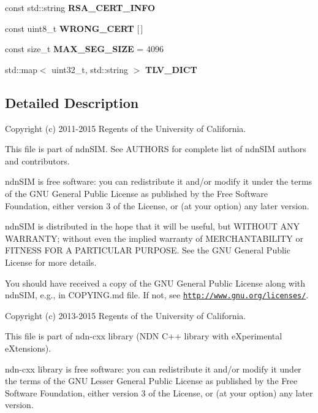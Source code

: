 \begin{DoxyCompactItemize}
\item 
const std\+::string {\bfseries R\+S\+A\+\_\+\+C\+E\+R\+T\+\_\+\+I\+N\+FO}
\item 
const uint8\+\_\+t {\bfseries W\+R\+O\+N\+G\+\_\+\+C\+E\+RT} \mbox{[}$\,$\mbox{]}
\item 
const size\+\_\+t {\bfseries M\+A\+X\+\_\+\+S\+E\+G\+\_\+\+S\+I\+ZE} = 4096\hypertarget{namespacendn_a19fec05a319244ed54c7f95a86642722}{}\label{namespacendn_a19fec05a319244ed54c7f95a86642722}

\item 
std\+::map$<$ uint32\+\_\+t, std\+::string $>$ {\bfseries T\+L\+V\+\_\+\+D\+I\+CT}
\end{DoxyCompactItemize}


\subsection{Detailed Description}
Copyright (c) 2011-\/2015 Regents of the University of California.

This file is part of ndn\+S\+IM. See A\+U\+T\+H\+O\+RS for complete list of ndn\+S\+IM authors and contributors.

ndn\+S\+IM is free software\+: you can redistribute it and/or modify it under the terms of the G\+NU General Public License as published by the Free Software Foundation, either version 3 of the License, or (at your option) any later version.

ndn\+S\+IM is distributed in the hope that it will be useful, but W\+I\+T\+H\+O\+UT A\+NY W\+A\+R\+R\+A\+N\+TY; without even the implied warranty of M\+E\+R\+C\+H\+A\+N\+T\+A\+B\+I\+L\+I\+TY or F\+I\+T\+N\+E\+SS F\+OR A P\+A\+R\+T\+I\+C\+U\+L\+AR P\+U\+R\+P\+O\+SE. See the G\+NU General Public License for more details.

You should have received a copy of the G\+NU General Public License along with ndn\+S\+IM, e.\+g., in C\+O\+P\+Y\+I\+N\+G.\+md file. If not, see \href{http://www.gnu.org/licenses/}{\tt http\+://www.\+gnu.\+org/licenses/}.

Copyright (c) 2013-\/2015 Regents of the University of California.

This file is part of ndn-\/cxx library (N\+DN C++ library with e\+Xperimental e\+Xtensions).

ndn-\/cxx library is free software\+: you can redistribute it and/or modify it under the terms of the G\+NU Lesser General Public License as published by the Free Software Foundation, either version 3 of the License, or (at your option) any later version.

